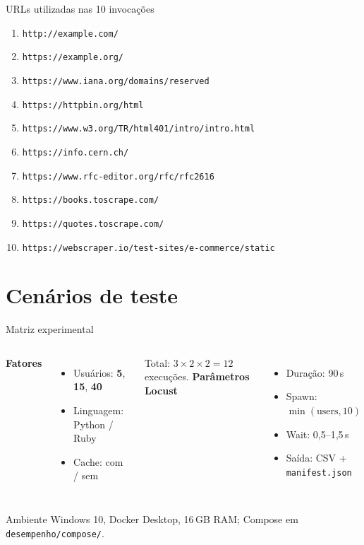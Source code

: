 \documentclass[aspectratio=169,11pt]{beamer}
\begin{document}
\begin{frame}{URLs utilizadas nas 10 invocações}
  \scriptsize
  \begin{enumerate}
    \item \texttt{http://example.com/}
    \item \texttt{https://example.org/}
    \item \texttt{https://www.iana.org/domains/reserved}
    \item \texttt{https://httpbin.org/html}
    \item \texttt{https://www.w3.org/TR/html401/intro/intro.html}
    \item \texttt{https://info.cern.ch/}
    \item \texttt{https://www.rfc-editor.org/rfc/rfc2616}
    \item \texttt{https://books.toscrape.com/}
    \item \texttt{https://quotes.toscrape.com/}
    \item \texttt{https://webscraper.io/test-sites/e-commerce/static}
  \end{enumerate}
\end{frame}

\section{Cenários de teste}

\begin{frame}{Matriz experimental}
  \begin{columns}[T]
    \textbf{Fatores}
    \begin{itemize}
      \item Usuários: \textbf{5}, \textbf{15}, \textbf{40}
      \item Linguagem: Python / Ruby
      \item Cache: com / sem
    \end{itemize}
    Total: $3 \times 2 \times 2 = 12$ execuções.
    \textbf{Parâmetros Locust}
    \begin{itemize}
      \item Duração: 90\,s
      \item Spawn: $\min(\text{users}, 10)$
      \item Wait: 0,5--1,5\,s
      \item Saída: CSV + \texttt{manifest.json}
    \end{itemize}
  \end{columns}
  \vspace{0.5em}
  \begin{block}{Ambiente}
    Windows 10, Docker Desktop, 16\,GB RAM; Compose em \texttt{desempenho/compose/}.
  \end{block}
\end{frame}
\end{document}
